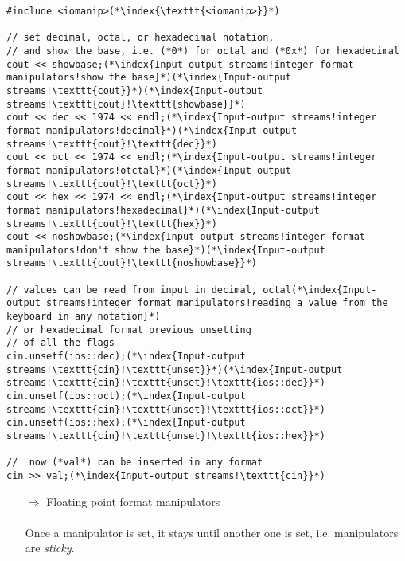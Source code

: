 \documentclass[10pt]{article}
\begin{document}
\begin{lstlisting}
#include <iomanip>(*\index{\texttt{<iomanip>}}*)

// set decimal, octal, or hexadecimal notation,
// and show the base, i.e. (*0*) for octal and (*0x*) for hexadecimal
cout << showbase;(*\index{Input-output streams!integer format manipulators!show the base}*)(*\index{Input-output streams!\texttt{cout}}*)(*\index{Input-output streams!\texttt{cout}!\texttt{showbase}}*)
cout << dec << 1974 << endl;(*\index{Input-output streams!integer format manipulators!decimal}*)(*\index{Input-output streams!\texttt{cout}!\texttt{dec}}*)
cout << oct << 1974 << endl;(*\index{Input-output streams!integer format manipulators!otctal}*)(*\index{Input-output streams!\texttt{cout}!\texttt{oct}}*)
cout << hex << 1974 << endl;(*\index{Input-output streams!integer format manipulators!hexadecimal}*)(*\index{Input-output streams!\texttt{cout}!\texttt{hex}}*)
cout << noshowbase;(*\index{Input-output streams!integer format manipulators!don't show the base}*)(*\index{Input-output streams!\texttt{cout}!\texttt{noshowbase}}*)

// values can be read from input in decimal, octal(*\index{Input-output streams!integer format manipulators!reading a value from the keyboard in any notation}*)
// or hexadecimal format previous unsetting
// of all the flags
cin.unsetf(ios::dec);(*\index{Input-output streams!\texttt{cin}!\texttt{unset}}*)(*\index{Input-output streams!\texttt{cin}!\texttt{unset}!\texttt{ios::dec}}*)
cin.unsetf(ios::oct);(*\index{Input-output streams!\texttt{cin}!\texttt{unset}!\texttt{ios::oct}}*)
cin.unsetf(ios::hex);(*\index{Input-output streams!\texttt{cin}!\texttt{unset}!\texttt{ios::hex}}*)

//  now (*val*) can be inserted in any format
cin >> val;(*\index{Input-output streams!\texttt{cin}}*)
\end{lstlisting}
\begin{enumerate}
\item[$\Rightarrow$] Floating point format manipulators\\ \\ Once a  manipulator is set, it stays until another one is set, i.e. manipulators are \emph{sticky}.
\end{enumerate}
\end{document}
